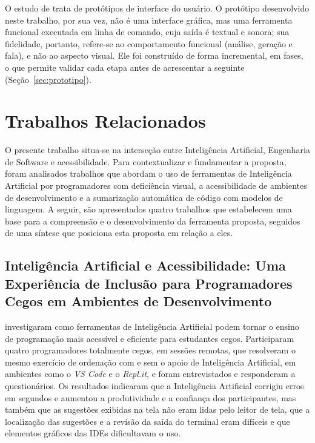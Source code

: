 \documentclass[
    12pt,                   %
    openright,              %
    oneside,                %
    a4paper,                %
    sumario=tradicional,    %
    english,                %
    brazil,                 %
    ]{abntex2}
\begin{document}
O estudo de \textcite{latinoware7985} trata de protótipos de interface do usuário. O protótipo desenvolvido neste trabalho, por sua vez, não é uma interface gráfica, mas uma ferramenta funcional executada em linha de comando, cuja saída é textual e sonora; sua fidelidade, portanto, refere-se ao comportamento funcional (análise, geração e fala), e não ao aspecto visual. Ele foi construído de forma incremental, em fases, o que permite validar cada etapa antes de acrescentar a seguinte (Seção~\ref{sec:prototipo}).


\chapter{Trabalhos Relacionados}\label{sec:TrabRel}

O presente trabalho situa-se na interseção entre Inteligência Artificial, Engenharia de Software e acessibilidade. Para contextualizar e fundamentar a proposta, foram analisados trabalhos que abordam o uso de ferramentas de Inteligência Artificial por programadores com deficiência visual, a acessibilidade de ambientes de desenvolvimento e a sumarização automática de código com modelos de linguagem. A seguir, são apresentados quatro trabalhos que estabelecem uma base para a compreensão e o desenvolvimento da ferramenta proposta, seguidos de uma síntese que posiciona esta proposta em relação a eles.

\section{Inteligência Artificial e Acessibilidade: Uma Experiência de Inclusão para Programadores Cegos em Ambientes de Desenvolvimento}

\textcite{latinoware34224} investigaram como ferramentas de Inteligência Artificial podem tornar o ensino de programação mais acessível e eficiente para estudantes cegos. Participaram quatro programadores totalmente cegos, em sessões remotas, que resolveram o mesmo exercício de ordenação com e sem o apoio de Inteligência Artificial, em ambientes como o \textit{VS Code} e o \textit{Repl.it}, e foram entrevistados e responderam a questionários. Os resultados indicaram que a Inteligência Artificial corrigiu erros em segundos e aumentou a produtividade e a confiança dos participantes, mas também que as sugestões exibidas na tela não eram lidas pelo leitor de tela, que a localização das sugestões e a revisão da saída do terminal eram difíceis e que elementos gráficos das IDEs dificultavam o uso.
\end{document}
